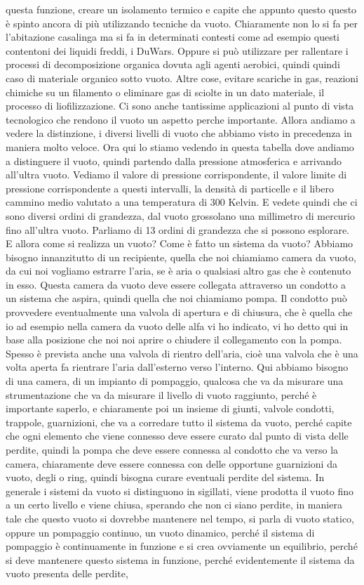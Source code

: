 questa funzione, creare un isolamento termico e capite che appunto questo questo è spinto ancora di più utilizzando tecniche da vuoto. Chiaramente non lo si fa per l'abitazione casalinga ma si fa in determinati contesti come ad esempio questi contentoni dei liquidi freddi, i DuWars. Oppure si può utilizzare per rallentare i processi di decomposizione organica dovuta agli agenti aerobici, quindi quindi caso di materiale organico sotto vuoto. Altre cose, evitare scariche in gas, reazioni chimiche su un filamento o eliminare gas di sciolte in un dato materiale, il processo di liofilizzazione. Ci sono anche tantissime applicazioni al punto di vista tecnologico che rendono il vuoto un aspetto perche importante. Allora andiamo a vedere la distinzione, i diversi livelli di vuoto che abbiamo visto in precedenza in maniera molto veloce. Ora qui lo stiamo vedendo in questa tabella dove andiamo a distinguere il vuoto, quindi partendo dalla pressione atmosferica e arrivando all'ultra vuoto. Vediamo il valore di pressione corrispondente, il valore limite di pressione corrispondente a questi intervalli, la densità di particelle e il libero cammino medio valutato a una temperatura di 300 Kelvin. E vedete quindi che ci sono diversi ordini di grandezza, dal vuoto grossolano una millimetro di mercurio fino all'ultra vuoto. Parliamo di 13 ordini di grandezza che si possono esplorare. E allora come si realizza un vuoto? Come è fatto un sistema da vuoto? Abbiamo bisogno innanzitutto di un recipiente, quella che noi chiamiamo camera da vuoto, da cui noi vogliamo estrarre l'aria, se è aria o qualsiasi altro gas che è contenuto in esso. Questa camera da vuoto deve essere collegata attraverso un condotto a un sistema che aspira, quindi quella che noi chiamiamo pompa. Il condotto può provvedere eventualmente una valvola di apertura e di chiusura, che è quella che io ad esempio nella camera da vuoto delle alfa vi ho indicato, vi ho detto qui in base alla posizione che noi noi aprire o chiudere il collegamento con la pompa. Spesso è prevista anche una valvola di rientro dell'aria, cioè una valvola che è una volta aperta fa rientrare l'aria dall'esterno verso l'interno. Qui abbiamo bisogno di una camera, di un impianto di pompaggio, qualcosa che va da misurare una strumentazione che va da misurare il livello di vuoto raggiunto, perché è importante saperlo, e chiaramente poi un insieme di giunti, valvole condotti, trappole, guarnizioni, che va a corredare tutto il sistema da vuoto, perché capite che ogni elemento che viene connesso deve essere curato dal punto di vista delle perdite, quindi la pompa che deve essere connessa al condotto che va verso la camera, chiaramente deve essere connessa con delle opportune guarnizioni da vuoto, degli o ring, quindi bisogna curare eventuali perdite del sistema. In generale i sistemi da vuoto si distinguono in sigillati, viene prodotta il vuoto fino a un certo livello e viene chiusa, sperando che non ci siano perdite, in maniera tale che questo vuoto si dovrebbe mantenere nel tempo, si parla di vuoto statico, oppure un pompaggio continuo, un vuoto dinamico, perché il sistema di pompaggio è continuamente in funzione e si crea ovviamente un equilibrio, perché si deve mantenere questo sistema in funzione, perché evidentemente il sistema da vuoto presenta delle perdite, 